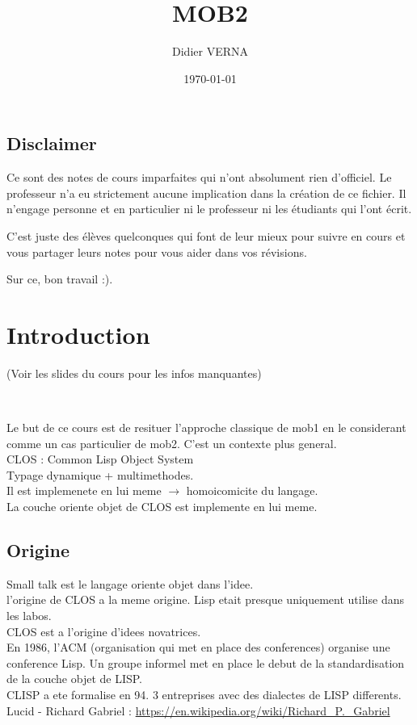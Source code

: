\documentclass[a4paper,11pt]{article}
\title{MOB2}
\author{Didier VERNA}
\date{\today}
\begin{document}
\maketitle
\subsection*{Disclaimer}

Ce sont des notes de cours imparfaites qui n'ont absolument rien d'officiel.
Le professeur n'a eu strictement aucune implication dans la création de ce
fichier. Il n'engage personne et en particulier ni le professeur ni les
étudiants qui l'ont écrit.

C'est juste des élèves quelconques qui font de leur mieux pour suivre en cours
et vous partager leurs notes pour vous aider dans vos révisions.

Sur ce, bon travail :).


\tableofcontents



\section{Introduction}
(Voir les slides du cours pour les infos manquantes)

\

Le but de ce cours est de resituer l'approche classique de mob1 en le considerant comme un cas particulier de mob2.
C'est un contexte plus general.\\
CLOS : Common Lisp Object System\\
Typage dynamique + multimethodes.\\
Il est implemenete en lui meme $\rightarrow$ homoicomicite du langage.\\
La couche oriente objet de CLOS est implemente en lui meme.\\
\subsection{Origine}
Small talk est le langage oriente objet dans l'idee.\\
l'origine de CLOS a la meme origine. Lisp etait presque uniquement utilise dans les labos.\\
CLOS est a l'origine d'idees novatrices.\\

En 1986, l'ACM (organisation qui met en place des conferences) organise une conference Lisp. Un groupe informel met en place le debut de la standardisation  de la couche objet de LISP.\\
CLISP a ete formalise en 94. 3 entreprises avec des dialectes de LISP differents.\\
Lucid - Richard Gabriel : \url{https://en.wikipedia.org/wiki/Richard_P._Gabriel}\\
\end{document}

